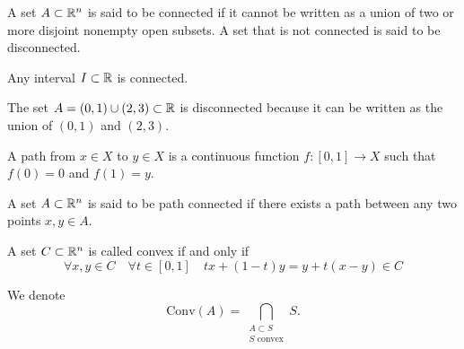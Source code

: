 \documentclass[11pt,a4paper]{article}
\begin{document}
\begin{definition}[Connectedness]
  A set $A \subset \mathbb{R}^n$ is said to be connected if it cannot be
  written as a union of two or more disjoint nonempty open subsets.
  A set that is not connected is said to be disconnected.
\end{definition}

\begin{example}
  Any interval $I \subset \mathbb{R}$ is connected.
\end{example}

\begin{example}
  The set $A = (0,1) \cup (2,3) \subset \mathbb{R}$ is disconnected because
  it can be written as the union of $(0,1)$ and $(2,3)$.
\end{example}

\begin{definition}[Path]
  A path from $x \in X$ to $y \in X$ is a continuous function 
  $f \colon [0,1] \to X$ such that $f(0) = 0$ and $f(1) = y$.
\end{definition}

\begin{definition}
  A set $A \subset \mathbb{R}^n$ is said to be path connected if there exists a path
  between any two points $x,y \in A$.
\end{definition}

\begin{definition}
  A set $C \subset \mathbb{R}^n$ is called convex if and only if
  \[
    \forall x,y \in C \quad \forall t \in [0,1] \quad
    tx + (1-t)y = y + t(x-y) \in C
  \]
\end{definition}
\begin{remark}
  We denote
  \[
    \mathrm{Conv}(A) = 
    \bigcap_{\substack{A \subset S \\ S \text{ convex}}} S.
  \]
\end{remark}

\newpage


\newpage
\end{document}
